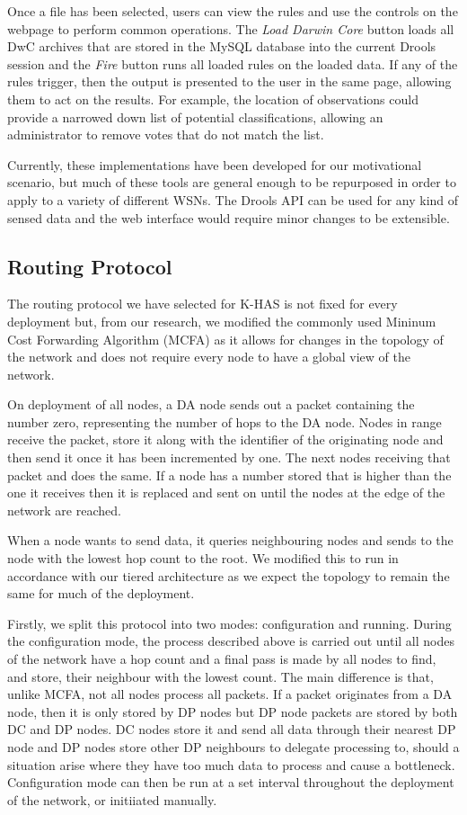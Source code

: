 	Once a file has been selected, users can view the rules and use the controls on the webpage to perform common operations. The \textit{Load Darwin Core} button loads all DwC archives that are stored in the MySQL database into the current Drools session and the \textit{Fire} button runs all loaded rules on the loaded data. If any of the rules trigger, then the output is presented to the user in the same page, allowing them to act on the results. For example, the location of observations could provide a narrowed down list of potential classifications, allowing an administrator to remove votes that do not match the list.
	
	Currently, these implementations have been developed for our motivational scenario, but much of these tools are general enough to be repurposed in order to apply to a variety of different WSNs. The Drools API can be used for any kind of sensed data and the web interface would require minor changes to be extensible.

	\subsection{Routing Protocol}\label{arch:routing}
		The routing protocol we have selected for K-HAS is not fixed for every deployment but, from our research, we modified the commonly used Mininum Cost Forwarding Algorithm (MCFA) as it allows for changes in the topology of the network and does not require every node to have a global view of the network.

		On deployment of all nodes, a DA node sends out a packet containing the number zero, representing the number of hops to the DA node. Nodes in range receive the packet, store it along with the identifier of the originating node and then send it once it has been incremented by one. The next nodes receiving that packet and does the same. If a node has a number stored that is higher than the one it receives then it is replaced and sent on until the nodes at the edge of the network are reached.

		When a node wants to send data, it queries neighbouring nodes and sends to the node with the lowest hop count to the root. We modified this to run in accordance with our tiered architecture as we expect the topology to remain the same for much of the deployment.

		Firstly, we split this protocol into two modes: configuration and running. During the configuration mode, the process described above is carried out until all nodes of the network have a hop count and a final pass is made by all nodes to find, and store, their neighbour with the lowest count. The main difference is that, unlike MCFA, not all nodes process all packets. If a packet originates from a DA node, then it is only stored by DP nodes but DP node packets are stored by both DC and DP nodes. DC nodes store it and send all data through their nearest DP node and DP nodes store other DP neighbours to delegate processing to, should a situation arise where they have too much data to process and cause a bottleneck. Configuration mode can then be run at a set interval throughout the deployment of the network, or initiiated manually.

